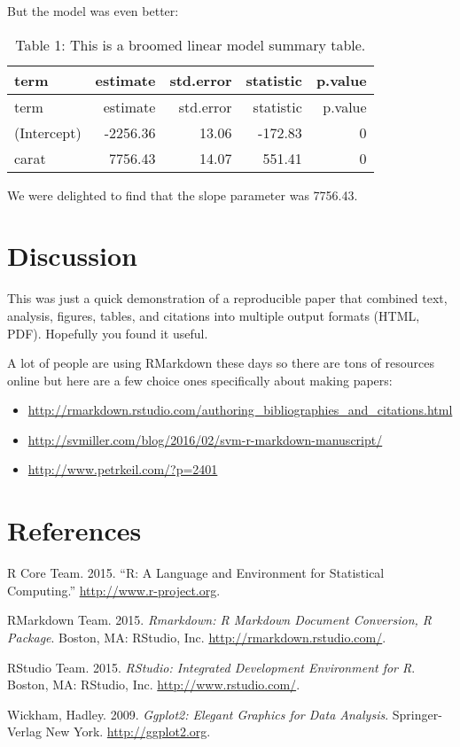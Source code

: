 \documentclass[]{article}
\providecommand{\tightlist}{%
  \setlength{\itemsep}{0pt}\setlength{\parskip}{0pt}}
\begin{document}
But the model was even better:

\begin{longtable}[]{@{}lrrrr@{}}
\caption{Table 1: This is a broomed linear model summary
table.}\tabularnewline
\toprule
term & estimate & std.error & statistic & p.value\tabularnewline
\midrule
\endfirsthead
\toprule
term & estimate & std.error & statistic & p.value\tabularnewline
\midrule
\endhead
(Intercept) & -2256.36 & 13.06 & -172.83 & 0\tabularnewline
carat & 7756.43 & 14.07 & 551.41 & 0\tabularnewline
\bottomrule
\end{longtable}

We were delighted to find that the slope parameter was 7756.43.

\section{Discussion}\label{discussion}

This was just a quick demonstration of a reproducible paper that
combined text, analysis, figures, tables, and citations into multiple
output formats (HTML, PDF). Hopefully you found it useful.

A lot of people are using RMarkdown these days so there are tons of
resources online but here are a few choice ones specifically about
making papers:

\begin{itemize}
\tightlist
\item
  \url{http://rmarkdown.rstudio.com/authoring_bibliographies_and_citations.html}
\item
  \url{http://svmiller.com/blog/2016/02/svm-r-markdown-manuscript/}
\item
  \url{http://www.petrkeil.com/?p=2401}
\end{itemize}

\section*{References}\label{references}

\hypertarget{refs}{}
\hypertarget{ref-RCoreTeam}{}
R Core Team. 2015. ``R: A Language and Environment for Statistical
Computing.'' \url{http://www.r-project.org}.

\hypertarget{ref-RMarkdown}{}
RMarkdown Team. 2015. \emph{Rmarkdown: R Markdown Document Conversion, R
Package}. Boston, MA: RStudio, Inc. \url{http://rmarkdown.rstudio.com/}.

\hypertarget{ref-RStudio}{}
RStudio Team. 2015. \emph{RStudio: Integrated Development Environment
for R}. Boston, MA: RStudio, Inc. \url{http://www.rstudio.com/}.

\hypertarget{ref-ggplot}{}
Wickham, Hadley. 2009. \emph{Ggplot2: Elegant Graphics for Data
Analysis}. Springer-Verlag New York. \url{http://ggplot2.org}.
\end{document}
